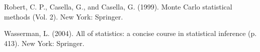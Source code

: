 \documentclass[a4paper, 11pt]{article}
\begin{document}
\begin{thebibliography}{9}

    Robert, C. P., Casella, G., and Casella, G. (1999). Monte Carlo statistical methods (Vol. 2). New York: Springer.

    Wasserman, L. (2004). All of statistics: a concise course in statistical inference (p. 413). New York: Springer.
    
\end{thebibliography}
      




    
\end{document}
